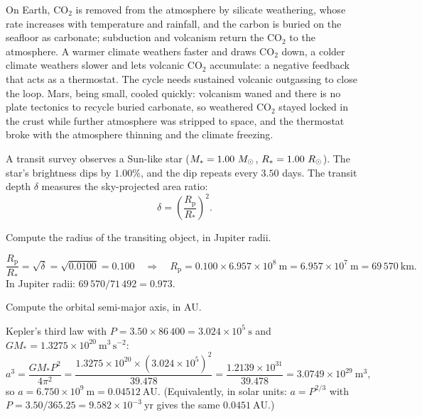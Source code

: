 \begin{solution}
On Earth, $\mathrm{CO_2}$ is removed from the atmosphere by silicate weathering, whose rate increases with temperature and rainfall, and the carbon is buried on the seafloor as carbonate; subduction and volcanism return the $\mathrm{CO_2}$ to the atmosphere.
A warmer climate weathers faster and draws $\mathrm{CO_2}$ down, a colder climate weathers slower and lets volcanic $\mathrm{CO_2}$ accumulate: a negative feedback that acts as a thermostat.
The cycle needs sustained volcanic outgassing to close the loop.
Mars, being small, cooled quickly: volcanism waned and there is no plate tectonics to recycle buried carbonate, so weathered $\mathrm{CO_2}$ stayed locked in the crust while further atmosphere was stripped to space, and the thermostat broke with the atmosphere thinning and the climate freezing.
\end{solution}



A transit survey observes a Sun-like star ($M_* = 1.00\ M_{\odot}$, $R_* = 1.00\ R_{\odot}$).
The star's brightness dips by $1.00\%$, and the dip repeats every $3.50$ days.
The transit depth $\delta$ measures the sky-projected area ratio:
\[
  \delta = \left( \frac{R_{\mathrm{p}}}{R_*} \right)^2.
\]

\parti {} Compute the radius of the transiting object, in Jupiter radii.

\begin{solution}
\[
  \frac{R_{\mathrm{p}}}{R_*} = \sqrt{\delta} = \sqrt{0.0100} = 0.100
  \quad \Longrightarrow \quad
  R_{\mathrm{p}} = 0.100 \times 6.957 \times 10^{8}\ \mathrm{m} = 6.957 \times 10^{7}\ \mathrm{m} = 69\,570\ \mathrm{km}.
\]
In Jupiter radii: $69\,570 / 71\,492 = 0.973$.
\end{solution}

\parti {} Compute the orbital semi-major axis, in AU.

\begin{solution}
Kepler's third law with $P = 3.50 \times 86\,400 = 3.024 \times 10^{5}\ \mathrm{s}$ and
$G M_* = 1.3275 \times 10^{20}\ \mathrm{m^3\,s^{-2}}$:
\[
  a^3 = \frac{G M_* P^2}{4\pi^2}
      = \frac{1.3275 \times 10^{20} \times (3.024 \times 10^{5})^2}{39.478}
      = \frac{1.2139 \times 10^{31}}{39.478}
      = 3.0749 \times 10^{29}\ \mathrm{m^3},
\]
so $a = 6.750 \times 10^{9}\ \mathrm{m} = 0.04512\ \mathrm{AU}$.
(Equivalently, in solar units: $a = P^{2/3}$ with $P = 3.50/365.25 = 9.582 \times 10^{-3}\ \mathrm{yr}$ gives the same $0.0451\ \mathrm{AU}$.)
\end{solution}


